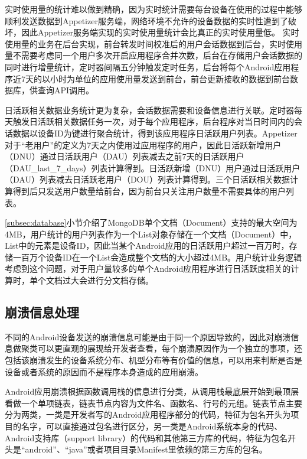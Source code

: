 实时使用量的统计难以做到精确，因为实时统计需要每台设备在使用的过程中能够顺利发送数据到Appetizer服务端，网络环境不允许的设备数据的实时性遭到了破坏，因此Appetizer服务端实现的实时使用量统计会比真正的实时使用量低。
实时使用量的业务在后台实现，前台转发时间校准后的用户会话数据到后台，实时使用量不需要考虑同一个用户多次开启应用程序合并次数，后台在存储用户会话数据的同时进行增量统计，定时器间隔五分钟触发定时任务，后台将每个Android应用程序近7天的以小时为单位的应用使用量发送到前台，前台更新接收的数据到前台数据库，供查询API调用。

日活跃相关数据业务统计更为复杂，会话数据需要和设备信息进行关联。定时器每天触发日活跃相关数据任务一次，对于每个应用程序，后台程序对当日时间内的会话数据以设备ID为键进行聚合统计，得到该应用程序日活跃用户列表。Appetizer对于“老用户”的定义为7天之内使用过应用程序的用户，因此日活跃新增用户（DNU）通过日活跃用户（DAU）列表减去之前7天的日活跃用户（DAU\_last\_7\_days）列表计算得到。日活跃新增（DNU）用户通过日活跃用户（DAU）列表减去日活跃老用户（DOU）列表计算得到。三个日活跃相关数据计算得到后只发送用户数量给前台，因为前台只关注用户数量不需要具体的用户列表。

\ref{subsec:database}小节介绍了MongoDB单个文档（Document）支持的最大空间为4MB，用户统计的用户列表作为一个List对象存储在一个文档（Document）中，List中的元素是设备ID，因此当某个Android应用的日活跃用户超过一百万时，存储一百万个设备ID在一个List会造成整个文档的大小超过4MB。用户统计业务逻辑考虑到这个问题，对于用户量较多的单个Android应用程序进行日活跃度相关的计算时，单个文档过大会进行分文档存储。

\subsection{崩溃信息处理}
\label{subsec:crashcomputing}

不同的Android设备发送的崩溃信息可能是由于同一个原因导致的，因此对崩溃信息做聚类可以更直观的展现给开发者查看，每个崩溃原因作为一个独立的事项，还包括该崩溃发生的设备系统分布、机型分布等有价值的信息，可以用来判断是否是设备或者系统的原因而不是程序本身造成的应用崩溃。

Android应用崩溃根据函数调用栈的信息进行分类，从调用栈最底层开始到最顶层看做一个单项链表，链表节点内容为文件名、函数名、行号的元组。链表节点主要分为两类，一类是开发者写的Android应用程序部分的代码，特征为包名开头为项目的名字，可以直接通过包名进行区分，另一类是Android系统本身的代码、Android支持库（support library）的代码和其他第三方库的代码，特征为包名开头是“android”、“java”或者项目目录Manifest里依赖的第三方库的包名。

